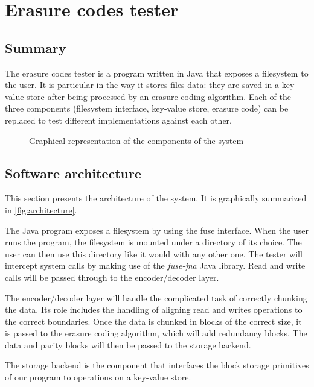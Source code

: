 \chapter{Erasure codes tester}

\section{Summary}

The erasure codes tester is a program written in Java that exposes a filesystem to the user.
It is particular in the way it stores files data: they are saved in a key-value store after being processed by an erasure coding algorithm.
Each of the three components (filesystem interface, key-value store, erasure code) can be replaced to test different implementations against each other.

\begin{figure}
	\centering
	
	\caption{Graphical representation of the components of the system}
	\label{fig:architecture}
\end{figure}

\section{Software architecture}
\label{subsec:architecture}

This section presents the architecture of the system.
It is graphically summarized in \autoref{fig:architecture}.

The Java program exposes a filesystem by using the \ac{fuse} interface.
When the user runs the program, the filesystem is mounted under a directory of its choice.
The user can then use this directory like it would with any other one.
The tester will intercept system calls by making use of the \textit{fuse-jna} \autocite{fuse-jna} Java library.
Read and write calls will be passed through to the encoder/decoder layer.

The encoder/decoder layer will handle the complicated task of correctly chunking the data.
Its role includes the handling of aligning read and writes operations to the correct boundaries.
Once the data is chunked in blocks of the correct size, it is passed to the erasure coding algorithm, which will add redundancy blocks.
The data and parity blocks will then be passed to the storage backend.

The storage backend is the component that interfaces the block storage primitives of our program to operations on a key-value store.

